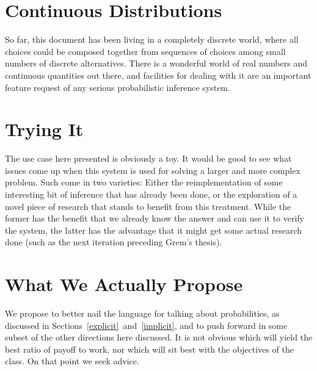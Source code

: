 \documentclass[12pt]{article}
\begin{document}
\section{Continuous Distributions}

So far, this document has been living in a completely discrete world,
where all choices could be composed together from sequences of choices
among small numbers of discrete alternatives.  There is a wonderful
world of real numbers and continuous quantities out there, and
facilities for dealing with it are an important feature request of any
serious probabilistic inference system.

\section{Trying It}

The use case here presented is obviously a toy.  It would be good to
see what issues come up when this system is used for solving a larger
and more complex problem.  Such come in two varieties: Either the
reimplementation of some interesting bit of inference that has already
been done, or the exploration of a novel piece of research that stands
to benefit from this treatment.  While the former has the benefit that
we already know the answer and can use it to verify the system, the
latter has the advantage that it might get some actual research done
(such as the next iteration preceding Grem's thesis).

\section{What We Actually Propose}

We propose to better nail the language for talking about
probabilities, as discussed in
Sections~\ref{explicit}~and~\ref{implicit}, and to push forward in
some subset of the other directions here discussed.  It is not obvious
which will yield the best ratio of payoff to work, nor which will sit
best with the objectives of the class.  On that point we seek advice.
\end{document}
